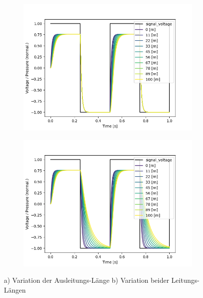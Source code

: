 \documentclass[fontsize=12pt, a4paper]{scrartcl}
\begin{document}
\begin{figure}[H]
	\centering
	\begin{subfigure}[H]{0.48\textwidth}
		\includegraphics[width=\textwidth, valign=t]{bilder/tubelength/tl_out_branch_multisweep.png}
	\end{subfigure}
	\begin{subfigure}[H]{0.48\textwidth}
		\includegraphics[width=\textwidth, valign=t]{bilder/tubelength/tl_both_branch_multisweep.png}
	\end{subfigure}
    \caption{a) Variation der Ausleitungs-Länge b) Variation beider Leitungs-Längen}
    \label{fig:sweepleitungen}
\end{figure}
\end{document}
